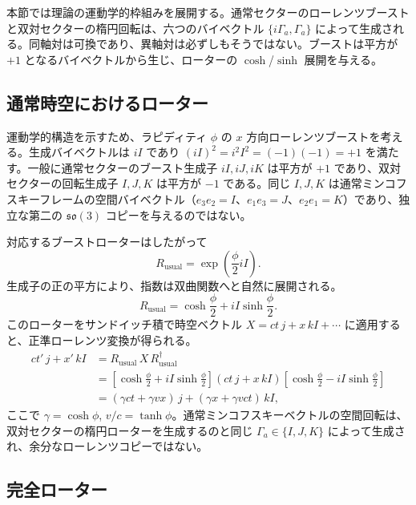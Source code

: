 \documentclass[a4paper]{article}
\begin{document}
本節では理論の運動学的枠組みを展開する。通常セクターのローレンツブーストと双対セクターの楕円回転は、六つのバイベクトル $\{i\Gamma_a,\Gamma_a\}$ によって生成される。同軸対は可換であり、異軸対は必ずしもそうではない。ブーストは平方が $+1$ となるバイベクトルから生じ、ローターの $\cosh$/$\sinh$ 展開を与える。

\subsection{通常時空におけるローター}

運動学的構造を示すため、ラピディティ $\phi$ の $x$ 方向ローレンツブーストを考える。生成バイベクトルは $iI$ であり $(iI)^2 = i^2 I^2 = (-1)(-1) = +1$ を満たす。一般に通常セクターのブースト生成子 $iI,iJ,iK$ は平方が $+1$ であり、双対セクターの回転生成子 $I,J,K$ は平方が $-1$ である。同じ $I,J,K$ は通常ミンコフスキーフレームの空間バイベクトル（$e_3e_2=I$、$e_1e_3=J$、$e_2e_1=K$）であり、独立な第二の $\mathfrak{so}(3)$ コピーを与えるのではない。

対応するブーストローターはしたがって
\[
R_\text{usual} = \exp\!\left( \frac{\phi}{2} iI \right).
\]
生成子の正の平方により、指数は双曲関数へと自然に展開される。
\[
R_\text{usual} = \cosh \frac{\phi}{2} + iI \sinh \frac{\phi}{2}.
\]
このローターをサンドイッチ積で時空ベクトル $X = ct \, j + x \, kI + \cdots$ に適用すると、正準ローレンツ変換が得られる。
\begin{align*}
ct' \, j + x' \, kI &= R_\text{usual} \, X \, R_\text{usual}^\dagger \\
&= \left[ \cosh\frac{\phi}{2} + iI \sinh\frac{\phi}{2} \right] (ct \, j + x \, kI) \left[ \cosh\frac{\phi}{2} - iI \sinh\frac{\phi}{2} \right] \\
&= (\gamma ct + \gamma v x) \, j + (\gamma x + \gamma v ct) \, kI,
\end{align*}
ここで $\gamma = \cosh \phi$, $v/c = \tanh \phi$。通常ミンコフスキーベクトルの空間回転は、双対セクターの楕円ローターを生成するのと同じ $\Gamma_a\in\{I,J,K\}$ によって生成され、余分なローレンツコピーではない。

\subsection{完全ローター}
\end{document}
